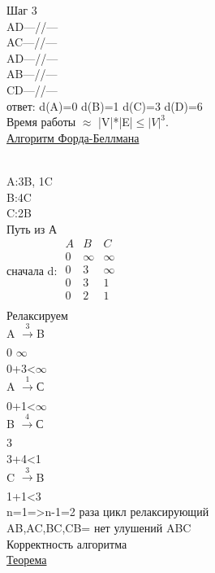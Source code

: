 \documentclass{article}
\begin{document}
Шаг 3\\
AD—//— \\
AC—//—\\
AD—//—\\
AB—//—\\
CD—//—\\
ответ: d(A)=0 d(B)=1 d(C)=3 d(D)=6\\
Время работы $\approx$ |V|*|E|$\leq|V|^3$.\\
\underline{Алгоритм Форда-Беллмана}\\
\\
A:3B, 1C\\
B:4C\\
C:2B\\
Путь из А\\
сначала d: 
$
\left.
\begin{array}{rcll}
A&B&C\\
0&\infty&\infty\\
0&3&\infty\\
0&3&1\\
0&2&1\\
\end{array}
\right.
$\\
Релаксируем\\
A $\xrightarrow[]{3}$B\\
0 \quad $\infty$\\
0+3<$\infty$\\
A $\xrightarrow[]{1}$С\\
0+1<$\infty$\\
B $\xrightarrow[]{4}$С\\
3 \\
3+4<1\\
C $\xrightarrow[]{3}$B\\
1+1<3\\
n=1=>n-1=2 раза цикл релаксирующий\\
AB,AC,BC,CB= нет улушений ABC\\
Корректность алгоритма\\
\underline{Теорема}\\
\end{document}
